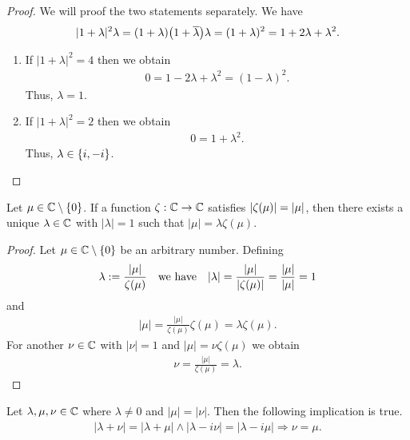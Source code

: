 \begin{proof}
	We will proof the two statements separately. We have
	\begin{align*}
		|1 + \lambda|^2 \lambda = (1 + \lambda) {\left ( 1 + \overline{\lambda} \right )} \lambda = (1 + \lambda)^2 = 1 + 2 \lambda + \lambda^2.
	\end{align*}
	\begin{enumerate}
		\item If $|1 + \lambda|^2 = 4$ then we obtain
			\begin{align*}
				0 = 1 - 2 \lambda + \lambda^2 = (1 - \lambda)^2.
			\end{align*} 
		Thus, $\lambda = 1$. 
		\item If $|1 + \lambda|^2 = 2$ then we obtain 
		\begin{align*}
			0 = 1 + \lambda^2.
		\end{align*}
		Thus, $\lambda \in {\left \{ i, -i \right \}}$.  
	\end{enumerate}
\end{proof}

\begin{lemma} \label{lemma:phase_adjustment_complex}
	Let $\mu \in \mathbb{C} \setminus \{0\}$. If a function $\zeta:\mathbb{C} \to \mathbb{C}$ satisfies ${\left | \zeta(\mu) \right |} = {\left | \mu \right |}$, then there exists a unique $\lambda \in \mathbb{C}$ with $|\lambda| = 1$ such that $|\mu| = \lambda \zeta(\mu)$. 
\end{lemma}

\begin{proof}
	Let $\mu \in \mathbb{C} \setminus \{0\}$ be an arbitrary number. Defining
	\begin{align*}
		\lambda := \frac{|\mu|}{\zeta(\mu)} \quad \text{we have} \quad |\lambda| = \frac{|\mu|}{|\zeta(\mu)|} = \frac{{\left | \mu \right |}}{{\left | \mu \right |}} = 1
	\end{align*}
	and
	\begin{align*}
		|\mu| = \frac{|\mu|}{\zeta(\mu)} \zeta(\mu) = \lambda \zeta(\mu).
	\end{align*}
	For another $\nu \in \mathbb{C}$ with $|\nu| = 1$ and $|\mu| = \nu \zeta(\mu)$ we obtain
	\begin{align*}
		\nu = \frac{|\mu|}{\zeta(\mu)} = \lambda.
	\end{align*}
\end{proof}

\begin{lemma} \label{lemma:complex_alg}
	Let $\lambda, \mu, \nu \in \mathbb{C}$ where $\lambda \neq 0$ and $|\mu| = |\nu|$. Then the following implication is  true. 
	\begin{align*}
		|\lambda + \nu| = |\lambda + \mu| \land |\lambda - i\nu| = |\lambda - i\mu| \Rightarrow \nu = \mu.
	\end{align*}
\end{lemma}

